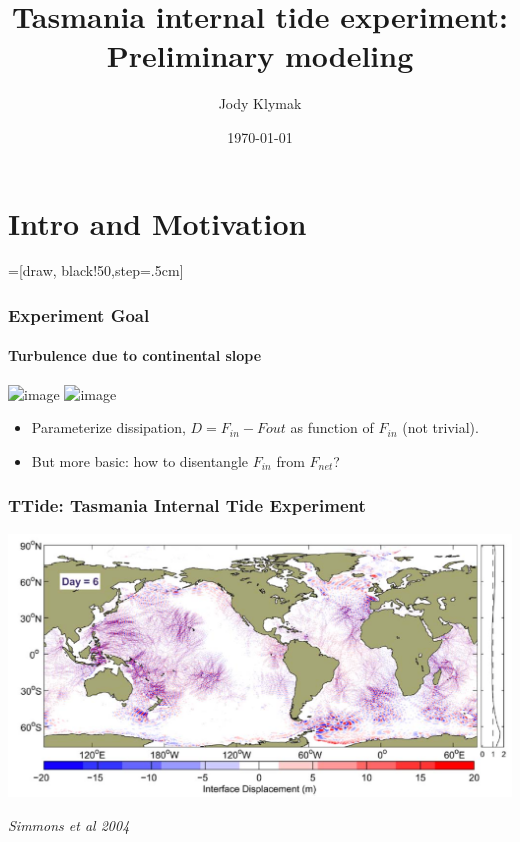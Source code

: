 \documentclass{beamer}
\title[TTide SIO 2015]{Tasmania internal tide experiment: Preliminary modeling}
\subtitle{}
\author{Jody Klymak}
\institute[UVic]{University of Victoria}
\date{\today}
\begin{document}
\frame{\titlepage}

\section{Intro and Motivation}
\def\tikzoverlay{%
   \tikz[baseline,overlay]\node[every overlay node]
}%


=[draw, black!50,step=.5cm]

\begin{frame}
  \frametitle{Experiment Goal}
  \framesubtitle{Turbulence due to continental slope}
  \includegraphics<1>[width=\textwidth,trim=0 0 0 0, clip]{../writeups/Time11Annote.png}
  \includegraphics<2>[width=\textwidth,trim=0 0 0 0, clip]{../writeups/Time11Annote2.png}
  
  \begin{itemize}
    \item<1->Parameterize dissipation, $D=F_{in}-F{out}$ as function of $F_{in}$ (not trivial).
    \item<2->But more basic: how to disentangle $F_{in}$ from $F_{net}$?  
  \end{itemize}
\end{frame}

\begin{frame}
  \frametitle{TTide: Tasmania Internal Tide Experiment}
  \includegraphics[width=\textwidth]{doc/SimmonsEtAl04a.png}
  
  \emph{Simmons et al 2004}
\end{frame}
\end{document}
